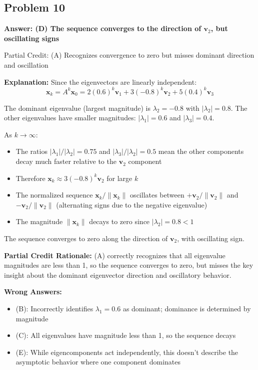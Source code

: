 \documentclass[12pt]{amsart}
\newcommand{\correct}[1]{{\color{correctgreen}\textbf{#1}}}
\newcommand{\partcred}[1]{{\color{partialblue}#1}}
\begin{document}
\subsection*{Problem 10}
\correct{Answer: (D) The sequence converges to the direction of $\mathbf{v}_2$, but oscillating signs}

\partcred{Partial Credit: (A) Recognizes convergence to zero but misses dominant direction and oscillation}

\textbf{Explanation:} Since the eigenvectors are linearly independent:
$$\mathbf{x}_k = A^k\mathbf{x}_0 = 2(0.6)^k\mathbf{v}_1 + 3(-0.8)^k\mathbf{v}_2 + 5(0.4)^k\mathbf{v}_3$$

The dominant eigenvalue (largest magnitude) is $\lambda_2 = -0.8$ with $|\lambda_2| = 0.8$. The other eigenvalues have smaller magnitudes: $|\lambda_1| = 0.6$ and $|\lambda_3| = 0.4$.

As $k \to \infty$:
\begin{itemize}
\item The ratios $|\lambda_1|/|\lambda_2| = 0.75$ and $|\lambda_3|/|\lambda_2| = 0.5$ mean the other components decay much faster relative to the $\mathbf{v}_2$ component
\item Therefore $\mathbf{x}_k \approx 3(-0.8)^k\mathbf{v}_2$ for large $k$
\item The normalized sequence $\mathbf{x}_k/\|\mathbf{x}_k\|$ oscillates between $+\mathbf{v}_2/\|\mathbf{v}_2\|$ and $-\mathbf{v}_2/\|\mathbf{v}_2\|$ (alternating signs due to the negative eigenvalue)
\item The magnitude $\|\mathbf{x}_k\|$ decays to zero since $|\lambda_2| = 0.8 < 1$
\end{itemize}

The sequence converges to zero along the direction of $\mathbf{v}_2$, with oscillating sign.

\textbf{Partial Credit Rationale:} (A) correctly recognizes that all eigenvalue magnitudes are less than 1, so the sequence converges to zero, but misses the key insight about the dominant eigenvector direction and oscillatory behavior.

\textbf{Wrong Answers:}
\begin{itemize}
\item (B): Incorrectly identifies $\lambda_1 = 0.6$ as dominant; dominance is determined by magnitude
\item (C): All eigenvalues have magnitude less than 1, so the sequence decays
\item (E): While eigencomponents act independently, this doesn't describe the asymptotic behavior where one component dominates
\end{itemize}
\end{document}

